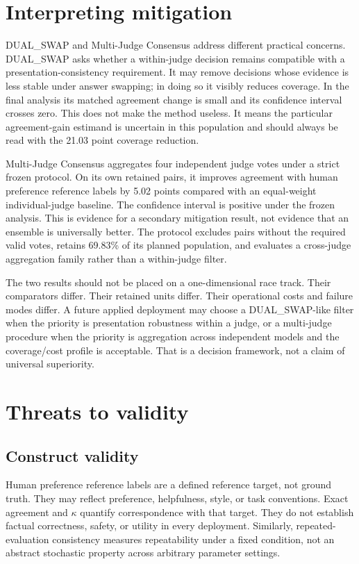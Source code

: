 \section{Interpreting mitigation}

DUAL\_SWAP and Multi-Judge Consensus address different practical concerns. DUAL\_SWAP asks whether a within-judge decision remains compatible with a presentation-consistency requirement. It may remove decisions whose evidence is less stable under answer swapping; in doing so it visibly reduces coverage. In the final analysis its matched agreement change is small and its confidence interval crosses zero. This does not make the method useless. It means the particular agreement-gain estimand is uncertain in this population and should always be read with the 21.03 point coverage reduction.

Multi-Judge Consensus aggregates four independent judge votes under a strict frozen protocol. On its own retained pairs, it improves agreement with human preference reference labels by 5.02 points compared with an equal-weight individual-judge baseline. The confidence interval is positive under the frozen analysis. This is evidence for a secondary mitigation result, not evidence that an ensemble is universally better. The protocol excludes pairs without the required valid votes, retains 69.83\% of its planned population, and evaluates a cross-judge aggregation family rather than a within-judge filter.

The two results should not be placed on a one-dimensional race track. Their comparators differ. Their retained units differ. Their operational costs and failure modes differ. A future applied deployment may choose a DUAL\_SWAP-like filter when the priority is presentation robustness within a judge, or a multi-judge procedure when the priority is aggregation across independent models and the coverage/cost profile is acceptable. That is a decision framework, not a claim of universal superiority.

\section{Threats to validity}

\subsection{Construct validity}
Human preference reference labels are a defined reference target, not ground truth. They may reflect preference, helpfulness, style, or task conventions. Exact agreement and $\kappa$ quantify correspondence with that target. They do not establish factual correctness, safety, or utility in every deployment. Similarly, repeated-evaluation consistency measures repeatability under a fixed condition, not an abstract stochastic property across arbitrary parameter settings.

